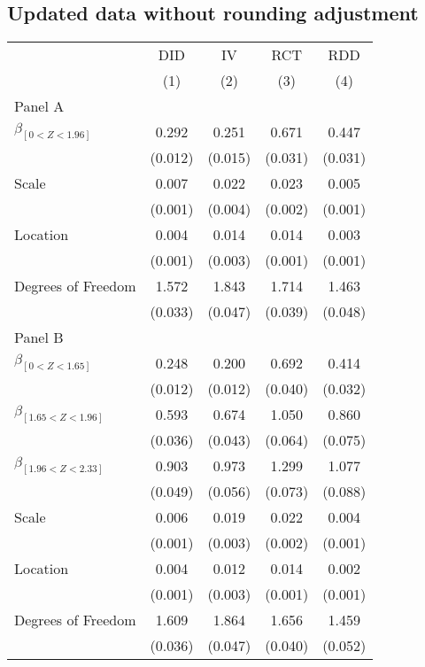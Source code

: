 \documentclass[
]{article}
\begin{document}
\hypertarget{updated-data-without-rounding-adjustment-1}{%
\subsection{Updated data without rounding
adjustment}\label{updated-data-without-rounding-adjustment-1}}

\def\sym#1{\ifmmode^{#1}\else\(^{#1}\)\fi} \begin{tabular}{l*{4}{c}} \hline\hline & \multicolumn{1}{c}{DID} &  \multicolumn{1}{c}{IV} &  \multicolumn{1}{c}{RCT} &  \multicolumn{1}{c}{RDD}\\  & \multicolumn{1}{c}{(1)} &  \multicolumn{1}{c}{(2)} &  \multicolumn{1}{c}{(3)} &  \multicolumn{1}{c}{(4)}\\  \hline \hline  Panel A \\  $\beta_{[0 < Z < 1.96]}$ & 0.292 &  0.251 &  0.671 &  0.447\\ & (0.012) &  (0.015) &  (0.031) &  (0.031)\\  Scale & 0.007 &  0.022 &  0.023 &  0.005\\ & (0.001) &  (0.004) &  (0.002) &  (0.001) \\  Location & 0.004 &  0.014 &  0.014 &  0.003\\ & (0.001) &  (0.003) &  (0.001) &  (0.001) \\  Degrees of Freedom & 1.572 &  1.843 &  1.714 &  1.463\\ & (0.033) &  (0.047) &  (0.039) &  (0.048)\\ Panel B \\  $\beta_{[0 < Z < 1.65]}$ & 0.248 &  0.200 &  0.692 &  0.414\\ & (0.012) &  (0.012) &  (0.040) &  (0.032)\\  $\beta_{[1.65 < Z < 1.96]}$ & 0.593 &  0.674 &  1.050 &  0.860\\ & (0.036) &  (0.043) &  (0.064) &  (0.075)\\   $\beta_{[1.96 < Z < 2.33]}$ & 0.903 &  0.973 &  1.299 &  1.077\\ & (0.049) &  (0.056) &  (0.073) &  (0.088)\\  Scale & 0.006 &  0.019 &  0.022 &  0.004\\ & (0.001) &  (0.003) &  (0.002) &  (0.001) \\  Location & 0.004 &  0.012 &  0.014 &  0.002\\ & (0.001) &  (0.003) &  (0.001) &  (0.001) \\  Degrees of Freedom & 1.609 &  1.864 &  1.656 &  1.459\\ & (0.036) &  (0.047) &  (0.040) &  (0.052)\\  \hline\hline \end{tabular}
\end{document}
